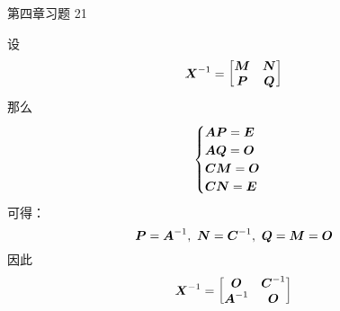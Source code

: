\begin{problem}
	第四章习题 21

	\begin{solution}
		设
		$$
		\boldsymbol{X}^{-1} = \begin{bmatrix}
			\boldsymbol{M} & \boldsymbol{N} \\
			\boldsymbol{P} & \boldsymbol{Q}
		\end{bmatrix}
		$$
		那么
		$$
		\begin{cases}
			\boldsymbol{A} \boldsymbol{P} = \boldsymbol{E} \\
			\boldsymbol{A} \boldsymbol{Q} = \boldsymbol{O} \\
			\boldsymbol{C} \boldsymbol{M} = \boldsymbol{O} \\
			\boldsymbol{C} \boldsymbol{N} = \boldsymbol{E}
		\end{cases}
		$$
		可得：
		$$
		\boldsymbol{P} = \boldsymbol{A}^{-1},\ \boldsymbol{N} = \boldsymbol{C}^{-1},\ \boldsymbol{Q} = \boldsymbol{M} = \boldsymbol{O}
		$$
		因此
		$$
		\boldsymbol{X}^{-1} = \begin{bmatrix}
			\boldsymbol{O} & \boldsymbol{C}^{-1} \\
			\boldsymbol{A}^{-1} & \boldsymbol{O}
		\end{bmatrix}
		$$
	\end{solution}
\end{problem}


